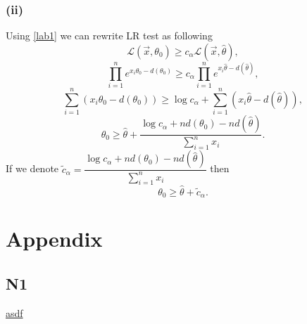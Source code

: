 \documentclass[a4paper, 12pt]{article}
\begin{document}
\subsubsection{(ii)}
Using \eqref{lab1} we can rewrite LR test as following
$$
\mathcal{L}(\vec{x}, \theta_0) \geqslant c_{\alpha} \mathcal{L}(\vec{x}, \hat{\theta}),
$$
$$
\prod \limits_{i=1}^n e^{x_i \theta_0 - d(\theta_0)} \geqslant c_{\alpha} \prod \limits_{i=1}^n e^{x_i \hat{\theta} - d(\hat{\theta})},
$$
$$
\sum \limits_{i=1}^n (x_i \theta_0 - d(\theta_0)) \geqslant \log c_{\alpha} + \sum \limits_{i=1}^n (x_i \hat{\theta} - d(\hat{\theta})),
$$
$$
\theta_0 \geqslant \hat{\theta} + \dfrac{\log c_{\alpha} + n d(\theta_0) - n d(\hat{\theta})}{\sum \limits_{i=1}^n x_i}.
$$
If we denote $\widetilde{c}_{\alpha} = \dfrac{\log c_{\alpha} + n d(\theta_0) - n d(\hat{\theta})}{\sum \limits_{i=1}^n x_i}$ then
$$
\theta_0 \geqslant \hat{\theta} + \widetilde{c}_{\alpha}.
$$

\section*{Appendix}
\subsection*{N1}
\href{hw3.html}{asdf}
\end{document}
